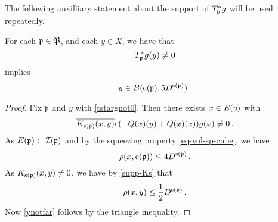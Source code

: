 The following auxilliary statement about the support of $T_{\mathfrak p}^*g$ will be used repeatedly.

\begin{lemma}\label{tile-range-support}
    \leanok
        For each ${\mathfrak p}\in {\mathfrak P}$, and each $y\in X$, we have that
    \begin{equation}\label{tstargnot0}
         T_{{\mathfrak p}}^* g(y)\neq 0
    \end{equation}
       implies
    \begin{equation}\label{ynotfar}
        y\in B({\mathrm{c}}({\mathfrak p}),5D^{{\mathrm{s}}({\mathfrak p})})\, .
    \end{equation}
    \end{lemma}
    \begin{proof}
    Fix ${\mathfrak p}$ and $y$ with \eqref{tstargnot0}.
    Then there exists $x\in E({\mathfrak p})$ with
    \begin{equation}
       \overline{K_{{\mathrm{s}}({\mathfrak p})}(x,y)}e(-{Q}(x)(y)
        +{Q}(x)(x))g(x) \neq 0\, .
    \end{equation}
    As $E({\mathfrak p})\subset {\mathcal{I}}({\mathfrak p})$ and by the squeezing property
    \eqref{eq-vol-sp-cube}, we have
    \begin{equation}
        \rho(x,{\mathrm{c}}({\mathfrak p}))\le 4D^{{\mathrm{s}}({\mathfrak p})}\, .
    \end{equation}
    As $K_{{\mathrm{s}}({\mathfrak p})}(x,y)\neq 0$, we have by \eqref{supp-Ks}
    that
    \begin{equation}
    \rho(x,y)\le \frac 12 D^{{\mathrm{s}}({\mathfrak p})}\, .
    \end{equation}
    Now \eqref{ynotfar} follows by the triangle inequality.
\end{proof}


